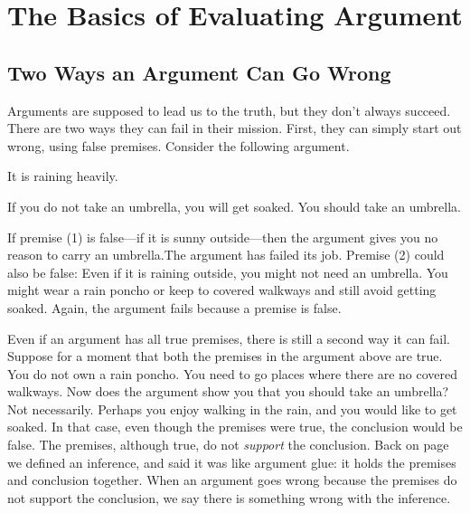 \chapter{The Basics of Evaluating Argument}
\label{chap:basicevaluation}
\setlength{\parindent}{1em}



\section{Two Ways an Argument Can Go Wrong}
\label{sec:two_ways}

Arguments are supposed to lead us to the truth, but they don't always succeed. There are two ways they can fail in their mission. First, they can simply start out wrong, using false premises. Consider the following argument.

\begin{earg*}
\item It is raining heavily.
\item If you do not take an umbrella, you will get soaked.
\itemc You should take an umbrella.
\end{earg*}

If premise (1) is false---if it is sunny outside---then the argument gives you no reason to carry an umbrella.The argument has failed its job. Premise (2) could also be false: Even if it is raining outside, you might not need an umbrella. You might wear a rain poncho or keep to covered walkways and still avoid getting soaked. Again, the argument fails because a premise is false.

Even if an argument has all true premises, there is still a second way it can fail. Suppose for a moment that both the premises in the argument above are true. You do not own a rain poncho. You need to go places where there are no covered walkways. Now does the argument show you that you should take an umbrella? Not necessarily. Perhaps you enjoy walking in the rain, and you would like to get soaked. In that case, even though the premises were true, the conclusion would be false. The premises, although true, do not \emph{support} the conclusion. Back on page \pageref{def:Inference} we defined an inference, and said  it was like argument glue: it holds the premises and conclusion together. When an argument goes wrong because the premises do not support the conclusion, we say there is something wrong with the inference. %

